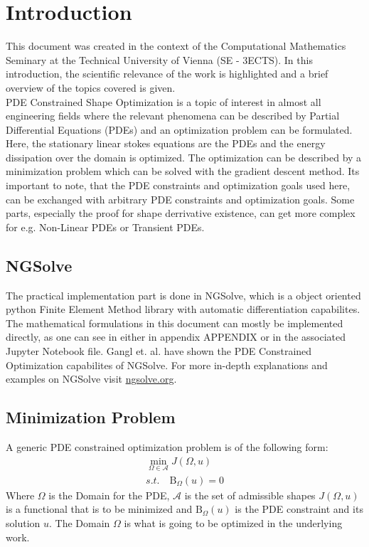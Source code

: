 \section{Introduction}

This document was created in the context of the Computational Mathematics Seminary
at the Technical University of Vienna (SE - 3ECTS). In this introduction, the scientific relevance
of the work is highlighted and a brief overview of the topics covered is given.\\

PDE Constrained Shape Optimization is a topic of interest in almost all engineering fields
where the relevant phenomena can be described by Partial Differential Equations (PDEs) and
an optimization problem can be formulated. Here, the stationary linear stokes equations are
the PDEs and the energy dissipation over the domain is optimized. The optimization can 
be described by a minimization problem which can be solved with the gradient descent method.
Its important to note, that the PDE constraints and optimization goals used here, 
can be exchanged with arbitrary PDE constraints and optimization goals. Some parts,
especially the proof for shape derrivative existence, can get more complex for e.g. 
Non-Linear PDEs or Transient PDEs.\\

\subsection*{NGSolve}
The practical implementation part is done in NGSolve, which is a object oriented python Finite Element
Method library with automatic differentiation capabilites. The mathematical formulations in this document 
can mostly be implemented directly, as one can see in either in appendix APPENDIX or in the associated
Jupyter Notebook file. Gangl et. al. \cite{fully_semi_paper_sturm} have shown the PDE Constrained 
Optimization capabilites of NGSolve. For more in-depth explanations and examples on NGSolve 
visit \href{https://ngsolve.org/}{ngsolve.org}.

\subsection*{Minimization Problem}
A generic PDE constrained optimization problem is of the following form:
\begin{align*}
        \min_{ \Omega \in \mathcal{A} } J( \Omega, u) \\
        s.t. \quad \mathrm{B}_{\Omega}(u) = 0
\end{align*}
Where $\Omega$ is the Domain for the PDE, $\mathcal{A}$ is the set of admissible shapes
$J(\Omega, u)$ is a functional that is to be minimized and $\mathrm{B}_{\Omega}(u)$ is the PDE
constraint and its solution $u$. The Domain $\Omega$ is what is going to be 
optimized in the underlying work. \\

